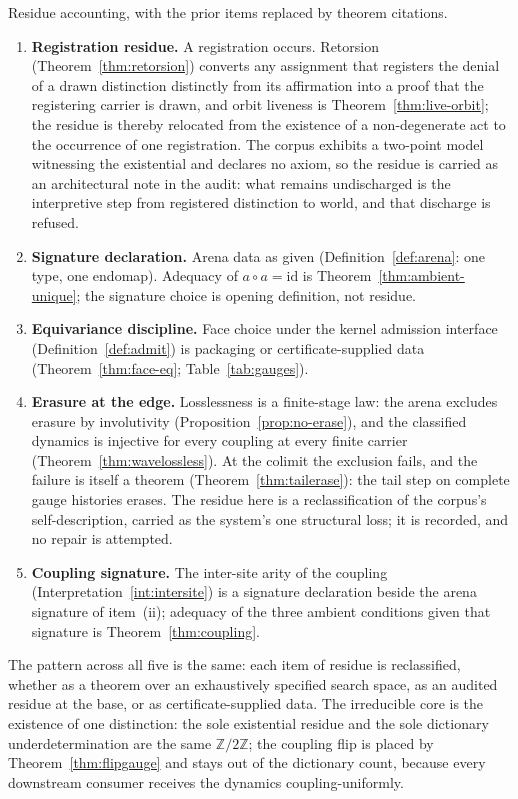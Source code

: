 \documentclass[11pt,a4paper]{article}
\theoremstyle{plain}
\theoremstyle{definition}
\theoremstyle{remark}
\newcommand{\comp}{\circ}
\newcommand{\Ztwo}{\mathbb{Z}/2\mathbb{Z}}
\begin{document}
\begin{statusphil}
Residue accounting, with the prior items replaced by theorem citations.
\begin{enumerate}[label=(\roman*)]
\item \textbf{Registration residue.} A registration occurs. Retorsion
(Theorem~\ref{thm:retorsion}) converts any assignment that registers
the denial of a drawn distinction distinctly from its affirmation into
a proof that the registering carrier is drawn, and orbit liveness is
Theorem~\ref{thm:live-orbit}; the residue is thereby relocated from the
existence of a non-degenerate act to the occurrence of one
registration. The corpus exhibits a two-point model witnessing the
existential and declares no axiom, so the residue is carried as an
architectural note in the audit: what remains undischarged is the
interpretive step from registered distinction to world, and that
discharge is refused.
\item \textbf{Signature declaration.} Arena data as given
(Definition~\ref{def:arena}: one type, one endomap). Adequacy of
$a\comp a=\mathrm{id}$ is Theorem~\ref{thm:ambient-unique}; the signature
choice is opening definition, not residue.
\item \textbf{Equivariance discipline.} Face choice under the kernel
admission interface (Definition~\ref{def:admit}) is packaging or
certificate-supplied data
(Theorem~\ref{thm:face-eq}; Table~\ref{tab:gauges}).
\item \textbf{Erasure at the edge.} Losslessness is a finite-stage
law: the arena excludes erasure by involutivity
(Proposition~\ref{prop:no-erase}), and the classified dynamics is
injective for every coupling at every finite carrier
(Theorem~\ref{thm:wavelossless}). At the colimit the exclusion fails,
and the failure is itself a theorem
(Theorem~\ref{thm:tailerase}): the tail step on complete gauge
histories erases. The residue here is a reclassification of the
corpus's self-description, carried as the system's one structural
loss; it is recorded, and no repair is attempted.
\item \textbf{Coupling signature.} The inter-site arity of the
coupling (Interpretation~\ref{int:intersite}) is a signature
declaration beside the arena signature of item~(ii); adequacy of the
three ambient conditions given that signature is
Theorem~\ref{thm:coupling}.
\end{enumerate}
\noindent
The pattern across all five is the same: each item of residue is
reclassified, whether as a theorem over an exhaustively specified search
space, as an audited residue at the base, or as certificate-supplied
data. The irreducible core is the
existence of one distinction: the sole existential residue and the sole
dictionary underdetermination are the same $\Ztwo$; the coupling flip
is placed by Theorem~\ref{thm:flipgauge} and stays out of the
dictionary count, because every downstream consumer receives the
dynamics coupling-uniformly.
\end{statusphil}
\end{document}

